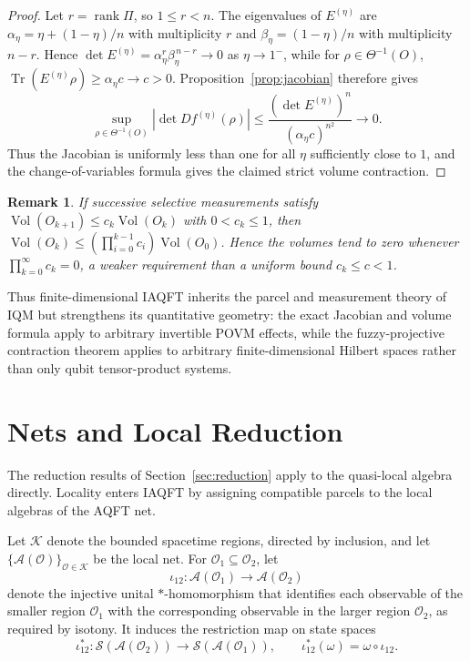 \documentclass[11pt]{article}
\newtheorem{remark}[theorem]{Remark}
\newcommand{\A}{\mathcal{A}}
\begin{document}
\begin{proof}
Let $r=\operatorname{rank}\Pi$, so $1\leq r<n$. The eigenvalues of
$E^{(\eta)}$ are
$\alpha_\eta=\eta+(1-\eta)/n$ with multiplicity $r$ and
$\beta_\eta=(1-\eta)/n$ with multiplicity $n-r$. Hence
$\det E^{(\eta)}=\alpha_\eta^r\beta_\eta^{\,n-r}\to0$ as
$\eta\to1^-$, while for $\rho\in\Theta^{-1}(O)$,
$\operatorname{Tr}(E^{(\eta)}\rho)\geq\alpha_\eta c\to c>0$.
Proposition~\ref{prop:jacobian} therefore gives
\[
\sup_{\rho\in\Theta^{-1}(O)}
\left|\det Df^{(\eta)}(\rho)\right|
\leq
\frac{(\det E^{(\eta)})^n}
     {(\alpha_\eta c)^{n^2}}
\longrightarrow0.
\]
Thus the Jacobian is uniformly less than one for all $\eta$ sufficiently
close to $1$, and the change-of-variables formula gives the claimed strict
volume contraction.
\end{proof}

\begin{remark}
If successive selective measurements satisfy
$\operatorname{Vol}(O_{k+1})\leq c_k\operatorname{Vol}(O_k)$ with
$0<c_k\leq1$, then
$\operatorname{Vol}(O_k)\leq
(\prod_{i=0}^{k-1}c_i)\operatorname{Vol}(O_0)$. Hence the volumes tend to
zero whenever $\prod_{k=0}^\infty c_k=0$, a weaker requirement than a
uniform bound $c_k\leq c<1$.
\end{remark}

Thus finite-dimensional IAQFT inherits the parcel and measurement theory
of IQM but strengthens its quantitative geometry: the exact Jacobian and
volume formula apply to arbitrary invertible POVM effects, while the
fuzzy-projective contraction theorem applies to arbitrary
finite-dimensional Hilbert spaces rather than only qubit tensor-product
systems.
\section{Nets and Local Reduction}\label{sec:nets-germs}

The reduction results of Section~\ref{sec:reduction} apply to the
quasi-local algebra directly. Locality enters IAQFT by assigning compatible
parcels to the local algebras of the AQFT net.

Let $\mathcal K$ denote the bounded spacetime regions, directed by
inclusion, and let $\{\A(\mathcal O)\}_{\mathcal O\in\mathcal K}$ be the
local net. For $\mathcal O_1\subseteq\mathcal O_2$, let
\[
\iota_{12}:\A(\mathcal O_1)\longrightarrow\A(\mathcal O_2)
\]
denote the injective unital $*$-homomorphism that identifies each
observable of the smaller region $\mathcal O_1$ with the corresponding
observable in the larger region $\mathcal O_2$, as required by isotony.
It induces the restriction map on state spaces
\[
\iota_{12}^*:
\mathcal S(\A(\mathcal O_2))
\longrightarrow
\mathcal S(\A(\mathcal O_1)),
\qquad
\iota_{12}^*(\omega)=\omega\circ\iota_{12}.
\]
\end{document}
